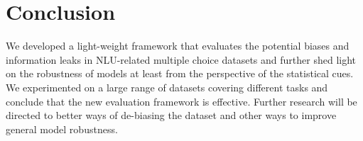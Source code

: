 \section{Conclusion}
We developed a light-weight 
framework that evaluates the
potential biases and information leaks in NLU-related multiple choice datasets and further shed light on
the robustness of models at least from the perspective of the statistical cues. 
We experimented on a large range of datasets covering different tasks and conclude that
the new evaluation framework is effective.
 Further research will be
directed to better ways of de-biasing the dataset and other ways to improve general model 
robustness.
